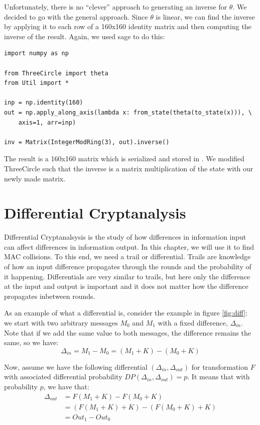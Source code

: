 \documentclass{report}
\newcommand{\ThreeCircle}{{\sc ThreeCircle} }
\begin{document}
Unfortunately, there is no ``clever'' approach to generating an inverse for $\theta$. We decided to go with the general approach.
Since $\theta$ is linear, we can find the inverse by applying it to each row of a 160x160 identity matrix and then computing the inverse of the result.
Again, we used sage to do this:
\begin{verbatim}
import numpy as np

from ThreeCircle import theta
from Util import *

inp = np.identity(160)
out = np.apply_along_axis(lambda x: from_state(theta(to_state(x))), \
    axis=1, arr=inp)

inv = Matrix(IntegerModRing(3), out).inverse()
\end{verbatim}
The result is a 160x160 matrix which is serialized and stored in . We modified \ThreeCircle such that the inverse is a matrix multiplication of the state with our newly made matrix.

\section{Differential Cryptanalysis}
Differential Cryptanalsysis is the study of how differences in information input can affect differences in information output. In this chapter, we will use it to find MAC collisions. To this end, we need a trail or differential. Trails are knowledge of how an input difference propagates through the rounds and the probability of it happening. Differentials are very similar to trails, but here only the difference at the input and output is important and it does not matter how the difference propagates inbetween rounds.

As an example of what a differential is, consider the example in figure \ref{fig:diff}:
we start with two arbitrary messages $M_0$ and $M_1$ with a fixed difference, $\Delta_{in}$. Note that if we add the same value to both messages, the difference remains the same, so we have: 
\begin{equation*}
\Delta_{in} = M_1 - M_0 = (M_1 + K) - (M_0 + K)
\end{equation*}

Now, assume we have the following differential $(\Delta_{in}, \Delta_{out})$ for transformation $F$ with associated differential probability $DP(\Delta_{in}, \Delta_{out}) = p$. It means that with probability $p$, we have that:
\begin{equation*}
\begin{split}
\Delta_{out} &= F(M_1 + K) - F(M_0 + K) \\
&= (F(M_1 + K) + K) - (F(M_0 + K) + K) \\
&= Out_1 - Out_0
\end{split}
\end{equation*}
\end{document}

